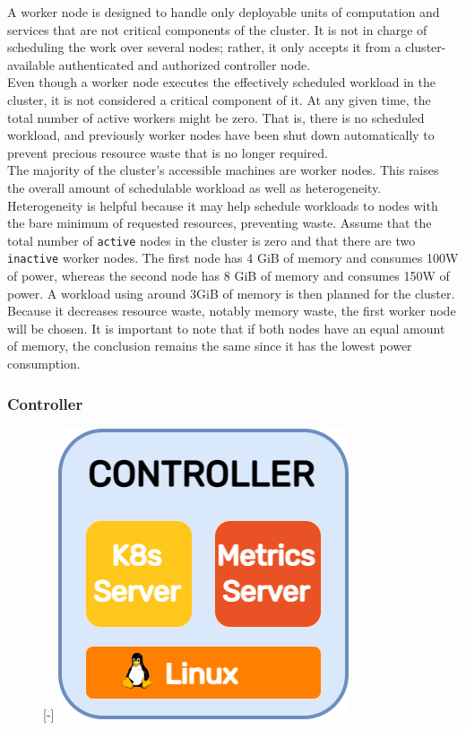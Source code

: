 A worker node is designed to handle only deployable units of computation and services
that are not critical components of the cluster. It is not in charge of
scheduling the work over several nodes; rather, it only accepts it from a
cluster-available authenticated and authorized controller node. \\ %
Even though a worker node executes the effectively scheduled workload in the
cluster, it is not considered a critical component of it. At any given time, the
total number of active workers might be zero. That is, there is no scheduled workload,
and previously worker nodes have been shut down automatically to prevent
precious resource waste that is no longer required. \\ %
The majority of the cluster's accessible machines are worker nodes. This raises the
overall amount of schedulable workload as well as heterogeneity. Heterogeneity
is helpful because it may help schedule workloads to nodes with the bare minimum
of requested resources, preventing waste. Assume that the total number of
\texttt{active} nodes in the cluster is zero and that there are two \texttt{inactive}
worker nodes. The first node has 4 GiB of memory and consumes 100W of power,
whereas the second node has 8 GiB of memory and consumes 150W of power. A workload
using around 3GiB of memory is then planned for the cluster. Because it
decreases resource waste, notably memory waste, the first worker node will be
chosen. It is important to note that if both nodes have an equal amount of memory,
the conclusion remains the same since it has the lowest power consumption.

\subsubsection{Controller}
\label{subsubsec:architecture_components_node_controller}

\begin{figure} %
  \raisebox{0pt}[\dimexpr\height-\baselineskip\relax]{\centering
  \includegraphics[width=.2\textwidth]{images/recluster/controller.png}}
\end{figure}

